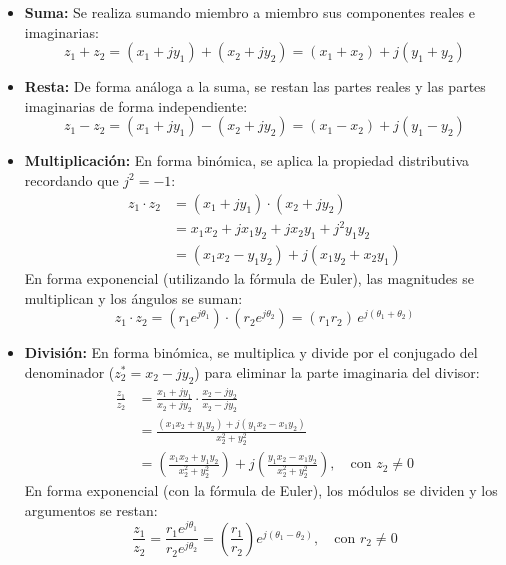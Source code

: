 \documentclass[11pt,a4paper]{article}
\begin{document}
\begin{itemize}
    \item \textbf{Suma:} Se realiza sumando miembro a miembro sus componentes reales e imaginarias:
    \begin{equation}
        z_1 + z_2 = (x_1 + jy_1) + (x_2 + jy_2) = (x_1 + x_2) + j(y_1 + y_2)
        \label{eq:suma_complejos}
    \end{equation}

    \item \textbf{Resta:} De forma análoga a la suma, se restan las partes reales y las partes imaginarias de forma independiente:
    \begin{equation}
        z_1 - z_2 = (x_1 + jy_1) - (x_2 + jy_2) = (x_1 - x_2) + j(y_1 - y_2)
        \label{eq:resta_complejos}
    \end{equation}

    \item \textbf{Multiplicación:}
    En forma binómica, se aplica la propiedad distributiva recordando que $j^2 = -1$:
    \begin{align}
        z_1 \cdot z_2 &= (x_1 + jy_1) \cdot (x_2 + jy_2) \nonumber \\
        &= x_1 x_2 + jx_1 y_2 + jx_2 y_1 + j^2 y_1 y_2 \nonumber \\
        &= (x_1 x_2 - y_1 y_2) + j(x_1 y_2 + x_2 y_1)
        \label{eq:mult_cartesiana}
    \end{align}
    En forma exponencial (utilizando la fórmula de Euler), las magnitudes se multiplican y los ángulos se suman:
    \begin{equation}
        z_1 \cdot z_2 = (r_1 e^{j\theta_1}) \cdot (r_2 e^{j\theta_2}) = (r_1 r_2) \, e^{j(\theta_1 + \theta_2)}
        \label{eq:mult_euler}
    \end{equation}

    \item \textbf{División:}
    En forma binómica, se multiplica y divide por el conjugado del denominador ($z_2^* = x_2 - jy_2$) para eliminar la parte imaginaria del divisor:
    \begin{align}
        \frac{z_1}{z_2} &= \frac{x_1 + jy_1}{x_2 + jy_2} \cdot \frac{x_2 - jy_2}{x_2 - jy_2} \nonumber \\
        &= \frac{(x_1 x_2 + y_1 y_2) + j(y_1 x_2 - x_1 y_2)}{x_2^2 + y_2^2} \nonumber \\
        &= \left(\frac{x_1 x_2 + y_1 y_2}{x_2^2 + y_2^2}\right) + j\left(\frac{y_1 x_2 - x_1 y_2}{x_2^2 + y_2^2}\right), \quad \text{con } z_2 \neq 0
        \label{eq:div_cartesiana}
    \end{align}
    En forma exponencial (con la fórmula de Euler), los módulos se dividen y los argumentos se restan:
    \begin{equation}
        \frac{z_1}{z_2} = \frac{r_1 e^{j\theta_1}}{r_2 e^{j\theta_2}} = \left(\frac{r_1}{r_2}\right) e^{j(\theta_1 - \theta_2)}, \quad \text{con } r_2 \neq 0
        \label{eq:div_euler}
    \end{equation}
\end{itemize}
\end{document}
